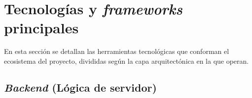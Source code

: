 
\section{Tecnologías y \textit{frameworks} principales}

En esta sección se detallan las herramientas tecnológicas que conforman el ecosistema del proyecto, divididas según la capa arquitectónica en la que operan.

\subsection{\textit{Backend} (Lógica de servidor)}

